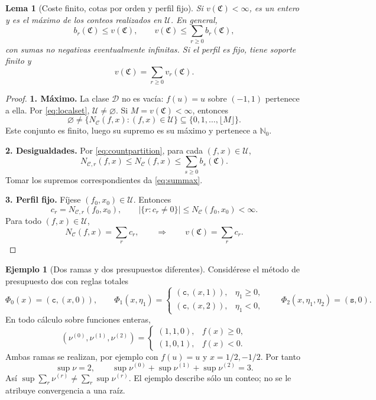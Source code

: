 \documentclass[11pt,a4paper]{article}
\numberwithin{equation}{section}
\newtheorem{lemma}[theorem]{Lema}
\theoremstyle{definition}
\newtheorem{example}[theorem]{Ejemplo}
\theoremstyle{remark}
\newcommand{\Nn}{\mathbb N_0}
\newcommand{\DD}{\mathcal D}
\newcommand{\ct}{\mathtt c}
\newcommand{\st}{\mathtt s}
\newcommand{\paso}[1]{\par\smallskip\noindent\textbf{#1}\quad}
\begin{document}
\begin{lemma}[Coste finito, cotas por orden y perfil fijo]\label{lem:costprofile}
Si $v(\mathfrak C)<\infty$, es un entero y es el máximo de los conteos realizados en $\mathcal U$. En general,
\begin{equation}\label{eq:summax}
b_r(\mathfrak C)\le v(\mathfrak C),\qquad
v(\mathfrak C)\le\sum_{r\ge0}b_r(\mathfrak C),
\end{equation}
con sumas no negativas eventualmente infinitas. Si el perfil es fijo, tiene soporte finito y
\begin{equation}\label{eq:fixedprofile}
v(\mathfrak C)=\sum_{r\ge0}v_r(\mathfrak C).
\end{equation}
\end{lemma}
\begin{proof}
\paso{1. Máximo.}
La clase $\DD$ no es vacía: $f(u)=u$ sobre $(-1,1)$ pertenece a ella. Por \eqref{eq:localset}, $\mathcal U\ne\varnothing$. Si $M=v(\mathfrak C)<\infty$, entonces
\[
\varnothing\ne\{N_{\mathscr C}(f,x):(f,x)\in\mathcal U\}
\subseteq\{0,1,\ldots,\lfloor M\rfloor\}.
\]
Este conjunto es finito, luego su supremo es su máximo y pertenece a $\Nn$.
\paso{2. Desigualdades.}
Por \eqref{eq:countpartition}, para cada $(f,x)\in\mathcal U$,
\[
N_{\mathscr C,r}(f,x)\le N_{\mathscr C}(f,x)
\le\sum_{s\ge0}b_s(\mathfrak C).
\]
Tomar los supremos correspondientes da \eqref{eq:summax}.
\paso{3. Perfil fijo.}
Fíjese $(f_0,x_0)\in\mathcal U$. Entonces
\[
c_r=N_{\mathscr C,r}(f_0,x_0),\qquad
|\{r:c_r\ne0\}|\le N_{\mathscr C}(f_0,x_0)<\infty.
\]
Para todo $(f,x)\in\mathcal U$,
\[
N_{\mathscr C}(f,x)=\sum_r c_r,
\qquad\Longrightarrow\qquad v(\mathfrak C)=\sum_r c_r.
\]
\end{proof}

\begin{example}[Dos ramas y dos presupuestos diferentes]\label{ex:branchcost}
Considérese el método de presupuesto dos con reglas totales
\[
\Phi_0(x)=(\ct,(x,0)),\qquad
\Phi_1(x,\eta_1)=
\begin{cases}(\ct,(x,1)),&\eta_1\ge0,\\(\ct,(x,2)),&\eta_1<0,\end{cases}
\qquad \Phi_2(x,\eta_1,\eta_2)=(\st,0).
\]
En todo cálculo sobre funciones enteras,
\[
(\nu^{(0)},\nu^{(1)},\nu^{(2)})=
\begin{cases}(1,1,0),&f(x)\ge0,\\(1,0,1),&f(x)<0.\end{cases}
\]
Ambas ramas se realizan, por ejemplo con $f(u)=u$ y $x=1/2,-1/2$. Por tanto
\[
\sup\nu=2,\qquad
\sup\nu^{(0)}+\sup\nu^{(1)}+\sup\nu^{(2)}=3.
\]
Así $\sup\sum_r\nu^{(r)}\ne\sum_r\sup\nu^{(r)}$. El ejemplo describe sólo un conteo; no se le atribuye convergencia a una raíz.
\end{example}
\end{document}
